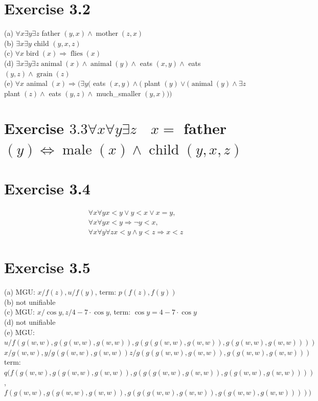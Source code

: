 \documentclass[10pt]{book}
\begin{document}
\begin{center}
\begin{enumerate}
\begin{center}
\begin{center}
\begin{center}
\begin{center}
\begin{center}
\section*{Exercise 3.2}
(a) $\forall x \exists y \exists z$ father $(y, x) \wedge \operatorname{mother}(z, x)$\\
(b) $\exists x \exists y$ child $(y, x, z)$\\
(c) $\forall x \operatorname{bird}(x) \Rightarrow \operatorname{flies}(x)$\\
(d) $\exists x \exists y \exists z \operatorname{animal}(x) \wedge \operatorname{animal}(y) \wedge$ eats $(x, y) \wedge$ eats $(y, z) \wedge \operatorname{grain}(z)$\\
(e) $\forall x$ animal $(x) \Rightarrow(\exists y($ eats $(x, y) \wedge($ plant $(y) \vee(\operatorname{animal}(y) \wedge \exists z$ plant $(z) \wedge$ eats $(y, z) \wedge$ much\_smaller $(y, x)))$

\section*{Exercise $3.3 \forall x \forall y \exists z \quad x=$ father $(y) \Leftrightarrow \operatorname{male}(x) \wedge \operatorname{child}(y, x, z)$}
\section*{Exercise 3.4}
$$
\begin{aligned}
& \forall x \forall y x<y \vee y<x \vee x=y, \\
& \forall x \forall y x<y \Rightarrow \neg y<x, \\
& \forall x \forall y \forall z x<y \wedge y<z \Rightarrow x<z
\end{aligned}
$$

\section*{Exercise 3.5}
(a) MGU: $x / f(z), u / f(y)$, term: $p(f(z), f(y))$\\
(b) not unifiable\\
(c) MGU: $x / \cos y, z / 4-7 \cdot \cos y$, term: $\cos y=4-7 \cdot \cos y$\\
(d) not unifiable\\
(e) MGU: $u / f(g(w, w), g(g(w, w), g(w, w)), g(g(g(w, w), g(w, w)), g(g(w, w), g(w, w))))$ $x / g(w, w), y / g(g(w, w), g(w, w)) z / g(g(g(w, w), g(w, w)), g(g(w, w), g(w, w)))$ term: $q(f(g(w, w), g(g(w, w), g(w, w)), g(g(g(w, w), g(w, w)), g(g(w, w), g(w, w))))$, $f(g(w, w), g(g(w, w), g(w, w)), g(g(g(w, w), g(w, w)), g(g(w, w), g(w, w)))))$


\end{center}
\end{center}
\end{center}
\end{center}
\end{center}
\end{enumerate}
\end{center}
\end{document}

